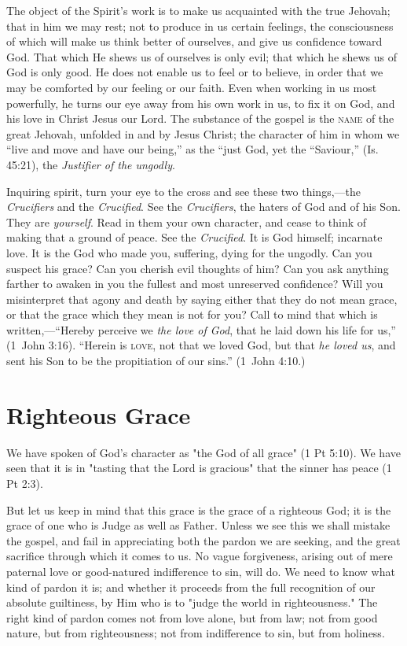 \documentclass[
]{book}
\begin{document}
The object of the Spirit's work is to make us acquainted with the true Jehovah; that in him we may rest; not to produce in us certain feelings, the consciousness of which will make us think better of ourselves, and give us confidence toward God. That which He shews us of ourselves is only evil; that which he shews us of God is only good. He does not enable us to feel or to believe, in order that we may be comforted by our feeling or our faith. Even when working in us most powerfully, he turns our eye away from his own work in us, to fix it on God, and his love in Christ Jesus our Lord. The substance of the gospel is the \textsc{name} of the great Jehovah, unfolded in and by Jesus Christ; the character of him in whom we ``live and move and have our being,'' as the ``just God, yet the ``Saviour,'' (Is. 45:21), the \emph{Justifier of the ungodly}.

Inquiring spirit, turn your eye to the cross and see these two things,---the \emph{Crucifiers} and the \emph{Crucified}. See the \emph{Crucifiers}, the haters of God and of his Son. They are \emph{yourself}. Read in them your own character, and cease to think of making that a ground of peace. See the \emph{Crucified}. It is God himself; incarnate love. It is the God who made you, suffering, dying for the ungodly. Can you suspect his grace? Can you cherish evil thoughts of him? Can you ask anything farther to awaken in you the fullest and most unreserved confidence? Will you misinterpret that agony and death by saying either that they do not mean grace, or that the grace which they mean is not for you? Call to mind that which is written,---``Hereby perceive we \emph{the love of God}, that he laid down his life for us,'' (1~John 3:16). ``Herein is \textsc{love}, not that we loved God, but that \emph{he loved us}, and sent his Son to be the propitiation of our sins.'' (1~John 4:10.)

\hypertarget{righteous-grace}{%
\chapter{Righteous Grace}\label{righteous-grace}}

We have spoken of God's character as "the God of all grace" (1 Pt 5:10). We have seen that it is in "tasting that the Lord is gracious" that the sinner has peace (1 Pt 2:3).

But let us keep in mind that this grace is the grace of a righteous God; it is the grace of one who is Judge as well as Father. Unless we see this we shall mistake the gospel, and fail in appreciating both the pardon we are seeking, and the great sacrifice through which it comes to us. No vague forgiveness, arising out of mere paternal love or good-natured indifference to sin, will do. We need to know what kind of pardon it is; and whether it proceeds from the full recognition of our absolute guiltiness, by Him who is to "judge the world in righteousness." The right kind of pardon comes not from love alone, but from law; not from good nature, but from righteousness; not from indifference to sin, but from holiness.
\end{document}
